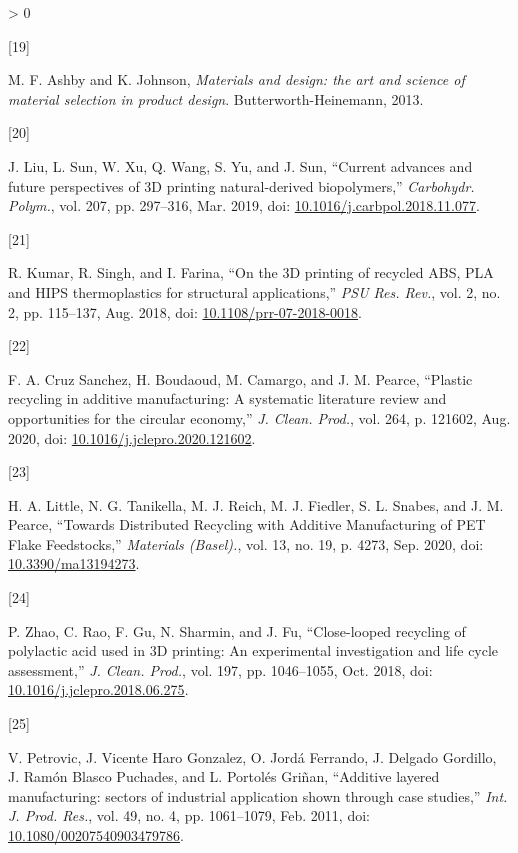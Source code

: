 \documentclass[conference,final,]{IEEEtran}
\newlength{\csllabelwidth}
\newlength{\cslhangindent}
\newenvironment{CSLReferences}[3] %
 {%
  \setlength{\parindent}{0pt}
  \ifodd #1 \everypar{\setlength{\hangindent}{\cslhangindent}}\ignorespaces\fi
  \ifnum #2 > 0
  \setlength{\parskip}{#2\baselineskip}
  \fi
 }%
 {}
\newcommand{\CSLLeftMargin}[1]{\parbox[t]{\csllabelwidth}{#1}}
\newcommand{\CSLRightInline}[1]{\parbox[t]{\linewidth - \csllabelwidth}{#1}}
\begin{document}
\begin{CSLReferences}{0}{0}
\leavevmode\hypertarget{ref-Ashby2013}{}%
\CSLLeftMargin{{[}19{]} }
\CSLRightInline{M. F. Ashby and K. Johnson, \emph{{Materials and design:
the art and science of material selection in product design}}.
Butterworth-Heinemann, 2013.}

\leavevmode\hypertarget{ref-Liu2019a}{}%
\CSLLeftMargin{{[}20{]} }
\CSLRightInline{J. Liu, L. Sun, W. Xu, Q. Wang, S. Yu, and J. Sun,
{``{Current advances and future perspectives of 3D printing
natural-derived biopolymers},''} \emph{Carbohydr. Polym.}, vol. 207, pp.
297--316, Mar. 2019, doi:
\href{https://doi.org/10.1016/j.carbpol.2018.11.077}{10.1016/j.carbpol.2018.11.077}.}

\leavevmode\hypertarget{ref-Kumar2018b}{}%
\CSLLeftMargin{{[}21{]} }
\CSLRightInline{R. Kumar, R. Singh, and I. Farina, {``{On the 3D
printing of recycled ABS, PLA and HIPS thermoplastics for structural
applications},''} \emph{PSU Res. Rev.}, vol. 2, no. 2, pp. 115--137,
Aug. 2018, doi:
\href{https://doi.org/10.1108/prr-07-2018-0018}{10.1108/prr-07-2018-0018}.}

\leavevmode\hypertarget{ref-CruzSanchez2020}{}%
\CSLLeftMargin{{[}22{]} }
\CSLRightInline{F. A. Cruz Sanchez, H. Boudaoud, M. Camargo, and J. M.
Pearce, {``{Plastic recycling in additive manufacturing: A systematic
literature review and opportunities for the circular economy},''}
\emph{J. Clean. Prod.}, vol. 264, p. 121602, Aug. 2020, doi:
\href{https://doi.org/10.1016/j.jclepro.2020.121602}{10.1016/j.jclepro.2020.121602}.}

\leavevmode\hypertarget{ref-Little2020}{}%
\CSLLeftMargin{{[}23{]} }
\CSLRightInline{H. A. Little, N. G. Tanikella, M. J. Reich, M. J.
Fiedler, S. L. Snabes, and J. M. Pearce, {``{Towards Distributed
Recycling with Additive Manufacturing of PET Flake Feedstocks},''}
\emph{Materials (Basel).}, vol. 13, no. 19, p. 4273, Sep. 2020, doi:
\href{https://doi.org/10.3390/ma13194273}{10.3390/ma13194273}.}

\leavevmode\hypertarget{ref-Zhao2018}{}%
\CSLLeftMargin{{[}24{]} }
\CSLRightInline{P. Zhao, C. Rao, F. Gu, N. Sharmin, and J. Fu,
{``{Close-looped recycling of polylactic acid used in 3D printing: An
experimental investigation and life cycle assessment},''} \emph{J.
Clean. Prod.}, vol. 197, pp. 1046--1055, Oct. 2018, doi:
\href{https://doi.org/10.1016/j.jclepro.2018.06.275}{10.1016/j.jclepro.2018.06.275}.}

\leavevmode\hypertarget{ref-Petrovic2011}{}%
\CSLLeftMargin{{[}25{]} }
\CSLRightInline{V. Petrovic, J. Vicente Haro Gonzalez, O. Jordá
Ferrando, J. Delgado Gordillo, J. Ramón Blasco Puchades, and L. Portolés
Griñan, {``{Additive layered manufacturing: sectors of industrial
application shown through case studies},''} \emph{Int. J. Prod. Res.},
vol. 49, no. 4, pp. 1061--1079, Feb. 2011, doi:
\href{https://doi.org/10.1080/00207540903479786}{10.1080/00207540903479786}.}


\end{CSLReferences}
\end{document}
